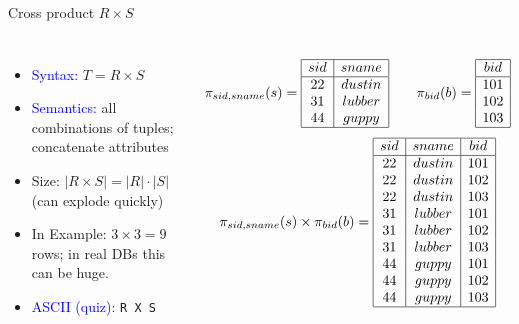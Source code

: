 \documentclass[10pt,aspectratio=169]{beamer}
\newcommand{\proj}{\pi}
\begin{document}
\begin{frame}{Cross product \(R \times S\)}
\begin{columns}[T,onlytextwidth]
\begin{itemize}
  \item \textcolor{blue}{Syntax:} \(T = R \times S\)
  \item \textcolor{blue}{Semantics:} all combinations of tuples; concatenate attributes
  \item Size: \(|R \times S| = |R|\cdot|S|\) (can explode quickly)
  \item In Example:  \(3\times 3=9\) rows; in real DBs this can be huge.
  \item \textcolor{blue}{ASCII (quiz):} \texttt{R X S}
\end{itemize}

\small
\[
\proj_{sid,sname}(s)=
\begin{array}{|c|c|}\hline
sid&sname\\\hline
22&dustin\\
31&lubber\\
44&guppy\\\hline
\end{array}
\qquad
\proj_{bid}(b)=
\begin{array}{|c|}\hline
bid\\\hline
101\\102\\103\\\hline
\end{array}
\]
\[
\proj_{sid,sname}(s)\times \proj_{bid}(b)=
\begin{array}{|c|c|c|}\hline
sid&sname&bid\\\hline
22&dustin&101\\22&dustin&102\\22&dustin&103\\
31&lubber&101\\31&lubber&102\\31&lubber&103\\
44&guppy&101\\44&guppy&102\\44&guppy&103\\\hline
\end{array}
\]
\end{columns}
\end{frame}
\end{document}
